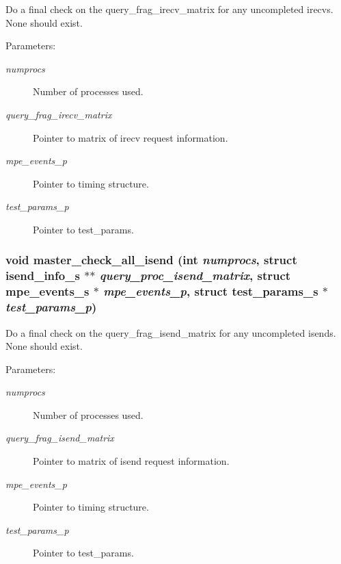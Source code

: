 Do a final check on the query\_\-frag\_\-irecv\_\-matrix for any uncompleted irecvs. None should exist.

\begin{Desc}
\item[Parameters:]
\begin{description}
\item[{\em numprocs}]Number of processes used. \item[{\em query\_\-frag\_\-irecv\_\-matrix}]Pointer to matrix of irecv request information. \item[{\em mpe\_\-events\_\-p}]Pointer to timing structure. \item[{\em test\_\-params\_\-p}]Pointer to test\_\-params. \end{description}
\end{Desc}
\subsubsection{\setlength{\rightskip}{0pt plus 5cm}void master\_\-check\_\-all\_\-isend (int {\em numprocs}, struct \bf{isend\_\-info\_\-s} $\ast$$\ast$ {\em query\_\-proc\_\-isend\_\-matrix}, struct \bf{mpe\_\-events\_\-s} $\ast$ {\em mpe\_\-events\_\-p}, struct \bf{test\_\-params\_\-s} $\ast$ {\em test\_\-params\_\-p})}\label{master__help_8h_e9e4357779e91a90668aa50975e3effe}


Do a final check on the query\_\-frag\_\-isend\_\-matrix for any uncompleted isends. None should exist.

\begin{Desc}
\item[Parameters:]
\begin{description}
\item[{\em numprocs}]Number of processes used. \item[{\em query\_\-frag\_\-isend\_\-matrix}]Pointer to matrix of isend request information. \item[{\em mpe\_\-events\_\-p}]Pointer to timing structure. \item[{\em test\_\-params\_\-p}]Pointer to test\_\-params. \end{description}
\end{Desc}
